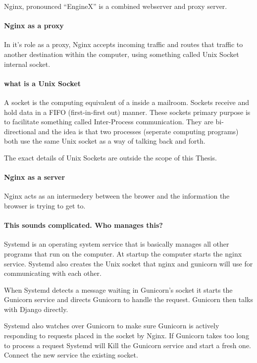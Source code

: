 Nginx, pronounced ``EngineX''  is a combined webserver and proxy server.

\paragraph{Nginx as a proxy}

In it's role as a proxy, Nginx accepts incoming traffic and routes that traffic to another destination within the computer, using something called Unix Socket internal socket.


\paragraph{what is a Unix Socket}

A socket is the computing equivalent of a inside a mailroom.  Sockets receive and hold data in a FIFO (first-in-first out) manner.  These sockets primary purpose is to facilitate something called Inter-Process communication.  They are bi-directional and the idea is that two processes (seperate computing programs) both use the same Unix socket as a way of talking back and forth.

The exact details of Unix Sockets are outside the scope of this Thesis.

\paragraph{Nginx as a server}

Nginx acts as an intermedery between the brower and the information the browser is trying to get to.


\paragraph{This sounds complicated.  Who manages this?}

Systemd is an operating system service that is basically manages all other programs that run on the computer.
At startup the computer starts the nginx service.  Systemd also creates the Unix socket that nginx and gunicorn will use for communicating with each other.

When Systemd detects a message waiting in Gunicorn's socket it starts the Gunicorn service and directs Gunicorn to handle the request.  Gunicorn then talks with Django directly.

Systemd also watches over Gunicorn to make sure Gunicorn is actively responding to requests placed in the socket by Nginx.  If Gunicorn takes too long to process a request Systemd will Kill the Gunicorn service and start a fresh one.  Connect the new service the existing socket.

